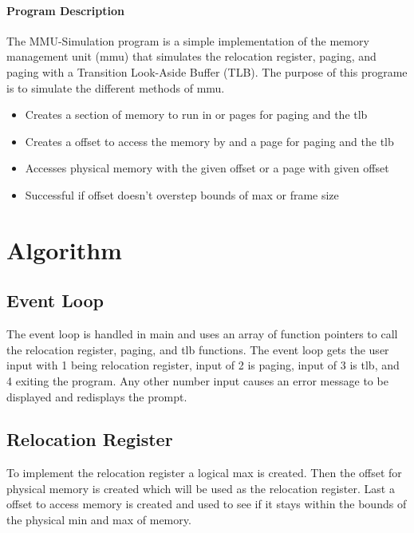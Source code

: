 \documentclass[11pt]{article}
\begin{document}
\maketitle


\begin{multicols}{2}

\paragraph{Program Description}
The MMU-Simulation program is a simple implementation of the memory management unit (mmu) that simulates the relocation register, paging, and paging with a Transition Look-Aside Buffer (TLB). The purpose of this programe is to simulate the different methods of mmu.
\begin{itemize}
\item 	Creates a section of memory to run in or pages for paging and the tlb

\item	Creates a offset to access the memory by and a page for paging and the tlb

\item	Accesses physical memory with the given offset or a page with given offset

\item	Successful if offset doesn't overstep bounds of max or frame size
\end{itemize}

\section{Algorithm}\label{algorithm}
\subsection{Event Loop}\label{event_loop}
The event loop is handled in main and uses an array of function pointers to call the relocation register, paging, and tlb functions. The event loop gets the user input with 1 being relocation register, input of 2 is paging, input of 3 is tlb, and 4 exiting the program. Any other number input causes an error message to be displayed and redisplays the prompt.

\subsection{Relocation Register}
To implement the relocation register a logical max is created. Then the offset for physical memory is created which will be used as the relocation register. Last a offset to access memory is created and used to see if it stays within the bounds of the physical min and max of memory.


\end{multicols}
\end{document}
